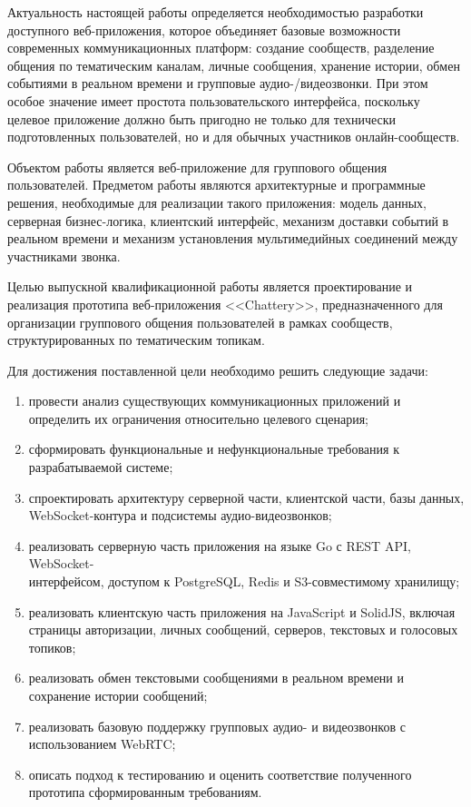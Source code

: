 \documentclass[a4paper,12pt]{extarticle}
\begin{document}
Актуальность настоящей работы определяется необходимостью разработки доступного веб-приложения, которое объединяет базовые возможности современных коммуникационных платформ: создание сообществ, разделение общения по тематическим каналам, личные сообщения, хранение истории, обмен событиями в реальном времени и групповые аудио-/видеозвонки. При этом особое значение имеет простота пользовательского интерфейса, поскольку целевое приложение должно быть пригодно не только для технически подготовленных пользователей, но и для обычных участников онлайн-сообществ.

Объектом работы является веб-приложение для группового общения пользователей. Предметом работы являются архитектурные и программные решения, необходимые для реализации такого приложения: модель данных, серверная бизнес-логика, клиентский интерфейс, механизм доставки событий в реальном времени и механизм установления мультимедийных соединений между участниками звонка.

Целью выпускной квалификационной работы является проектирование и реализация прототипа веб-приложения <<Chattery>>, предназначенного для организации группового общения пользователей в рамках сообществ, структурированных по тематическим топикам.

Для достижения поставленной цели необходимо решить следующие задачи:
\begin{enumerate}
    \item провести анализ существующих коммуникационных приложений и определить их ограничения относительно целевого сценария;
    \item сформировать функциональные и нефункциональные требования к разрабатываемой системе;
    \item спроектировать архитектуру серверной части, клиентской части, базы данных, \\WebSocket-контура и подсистемы аудио-видеозвонков;
    \item реализовать серверную часть приложения на языке Go с REST API, WebSocket-\\интерфейсом, доступом к PostgreSQL, Redis и S3-совместимому хранилищу;
    \item реализовать клиентскую часть приложения на JavaScript и SolidJS, включая страницы авторизации, личных сообщений, серверов, текстовых и голосовых топиков;
    \item реализовать обмен текстовыми сообщениями в реальном времени и сохранение истории сообщений;
    \item реализовать базовую поддержку групповых аудио- и видеозвонков с использованием WebRTC;
    \item описать подход к тестированию и оценить соответствие полученного прототипа сформированным требованиям.
\end{enumerate}
\end{document}
